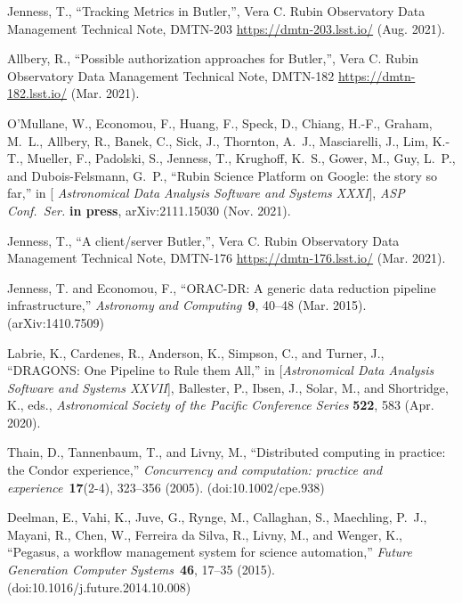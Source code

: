 \documentclass[]{spie}
\begin{document}
\begin{thebibliography}{10}
  Jenness, T., ``{Tracking Metrics in Butler},'', Vera C. Rubin Observatory Data
    Management Technical Note, DMTN-203 \url{https://dmtn-203.lsst.io/} (Aug.
    2021).

  Allbery, R., ``{Possible authorization approaches for Butler},'', Vera C. Rubin
    Observatory Data Management Technical Note, DMTN-182
    \url{https://dmtn-182.lsst.io/} (Mar. 2021).

  {O'Mullane}, W., {Economou}, F., {Huang}, F., {Speck}, D., {Chiang}, H.-F.,
    {Graham}, M.~L., {Allbery}, R., {Banek}, C., {Sick}, J., {Thornton}, A.~J.,
    {Masciarelli}, J., {Lim}, K.-T., {Mueller}, F., {Padolski}, S., {Jenness},
    T., {Krughoff}, K.~S., {Gower}, M., {Guy}, L.~P., and {Dubois-Felsmann},
    G.~P., ``{Rubin Science Platform on Google: the story so far},'' in [{\em
    Astronomical Data Analysis Software and Systems
    XXXI}{\nolinebreak\hspace{0.1em}]},  {\em ASP Conf.\ Ser.} {\bf in press},
    arXiv:2111.15030 (Nov. 2021).

  Jenness, T., ``{A client/server Butler},'', Vera C. Rubin Observatory Data
    Management Technical Note, DMTN-176 \url{https://dmtn-176.lsst.io/} (Mar.
    2021).

  {Jenness}, T. and {Economou}, F., ``{ORAC-DR: A generic data reduction pipeline
    infrastructure},'' {\em Astronomy and Computing}~{\bf 9},  40--48 (Mar.
    2015). (arXiv:1410.7509)

  {Labrie}, K., {Cardenes}, R., {Anderson}, K., {Simpson}, C., and {Turner}, J.,
    ``{DRAGONS: One Pipeline to Rule them All},'' in [{\em Astronomical Data
    Analysis Software and Systems XXVII}{\nolinebreak\hspace{0.1em}]},
    {Ballester}, P., {Ibsen}, J., {Solar}, M., and {Shortridge}, K., eds., {\em
    Astronomical Society of the Pacific Conference Series} {\bf 522},  583 (Apr.
    2020).

  Thain, D., Tannenbaum, T., and Livny, M., ``{Distributed computing in practice:
    the Condor experience},'' {\em Concurrency and computation: practice and
    experience}~{\bf 17}(2-4),  323--356 (2005). (doi:10.1002/cpe.938)

  Deelman, E., Vahi, K., Juve, G., Rynge, M., Callaghan, S., Maechling, P.~J.,
    Mayani, R., Chen, W., {Ferreira da Silva}, R., Livny, M., and Wenger, K.,
    ``Pegasus, a workflow management system for science automation,'' {\em Future
    Generation Computer Systems}~{\bf 46},  17--35 (2015).
    (doi:10.1016/j.future.2014.10.008)


\end{thebibliography}
\end{document}
